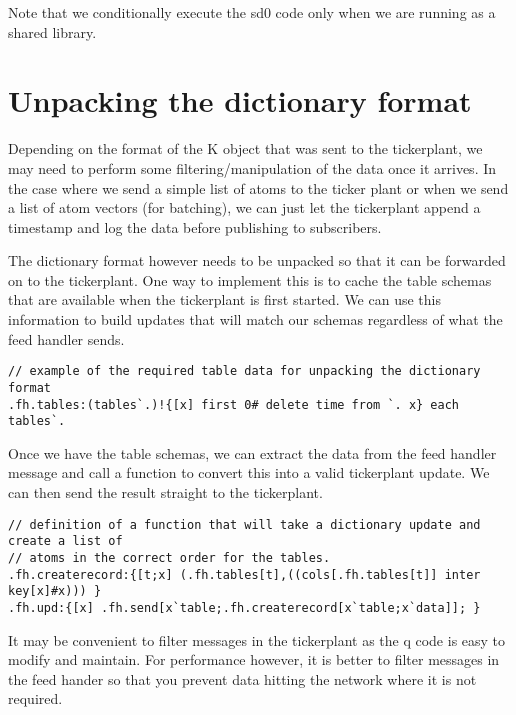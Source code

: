 Note that we conditionally execute the sd0 code only when we are running as a shared library.

\section{Unpacking the dictionary format}

Depending on the format of the K object that was sent to the tickerplant, we may need to perform some filtering/manipulation of
the data once it arrives. In the case where we send a simple list of atoms to the ticker plant or when we send a list of atom
vectors (for batching), we can just let the tickerplant append a timestamp and log the data before publishing to subscribers.

The dictionary format however needs to be unpacked so that it can be forwarded on to the tickerplant. One way to implement this
is to cache the table schemas that are available when the tickerplant is first started. We can use this information to build
updates that will match our schemas regardless of what the feed handler sends.

\begin{lstlisting}
// example of the required table data for unpacking the dictionary format
.fh.tables:(tables`.)!{[x] first 0# delete time from `. x} each tables`.
\end{lstlisting}

Once we have the table schemas, we can extract the data from the feed handler message and call a function to convert this into
a valid tickerplant update. We can then send the result straight to the tickerplant.

\begin{lstlisting}
// definition of a function that will take a dictionary update and create a list of
// atoms in the correct order for the tables.
.fh.createrecord:{[t;x] (.fh.tables[t],((cols[.fh.tables[t]] inter key[x]#x))) }
.fh.upd:{[x] .fh.send[x`table;.fh.createrecord[x`table;x`data]]; }
\end{lstlisting}

It may be convenient to filter messages in the tickerplant as the q code is easy to modify and maintain. For performance however,
it is better to filter messages in the feed hander so that you prevent data hitting the network where it is not required.




